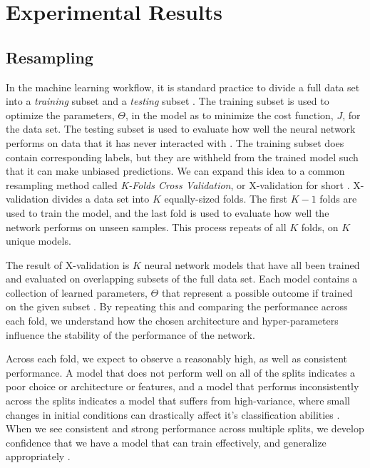 \documentclass[conference,onecolumn,letterpaper]{IEEEtran}
\begin{document}

\section{Experimental Results}
\label{sec:Results}


\subsection{Resampling}
\label{subsec:Resampling}

In the machine learning workflow, it is standard practice to divide a full data set into a \textit{training} subset and a \textit{testing} subset \cite{James,Virtanen}. The training subset is used to optimize the parameters, $\Theta$, in the model as to minimize the cost function, $J$, for the data set. The testing subset is used to evaluate how well the neural network performs on data that it has never interacted with \cite{Geron}. The training subset does contain corresponding labels, but they are withheld from the trained model such that it can make unbiased predictions.
We can expand this idea to a common resampling method called \textit{K-Folds Cross Validation}, or X-validation for short \cite{James}. X-validation divides a data set into $K$ equally-sized folds. The first $K-1$ folds are used to train the model, and the last fold is used to evaluate how well the network performs on unseen samples. This process repeats of all $K$ folds, on $K$ unique models.

The result of X-validation is $K$ neural network models that have all been trained and evaluated on overlapping subsets of the full data set. Each model contains a collection of learned parameters, $\Theta$ that represent a possible outcome if trained on the given subset \cite{Geron,James}. By repeating this and comparing the performance across each fold, we understand how the chosen architecture and hyper-parameters influence the stability of the performance of the network. 

Across each fold, we expect to observe a reasonably high, as well as consistent performance. A model that does not perform well on all of the splits indicates a poor choice or architecture or features, and a model that performs inconsistently across the splits indicates a model that suffers from high-variance, where small changes in initial conditions can drastically affect it's classification abilities \cite{James}. When we see consistent and strong performance across multiple splits, we develop confidence that we have a model that can train effectively, and generalize appropriately \cite{Geron}. 
\end{document}
